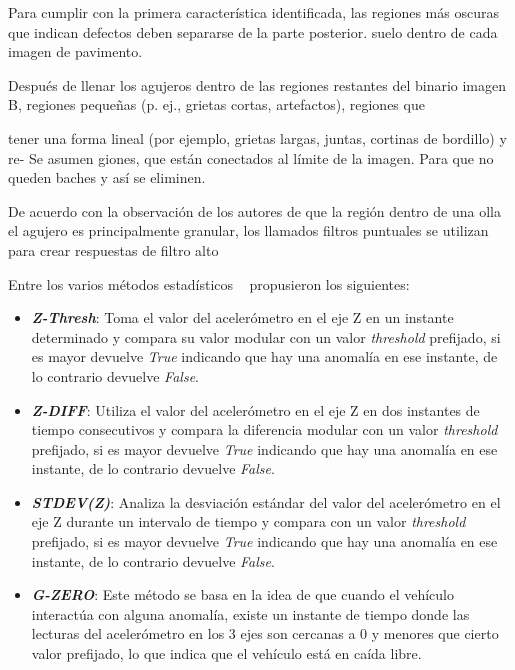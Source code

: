 Para cumplir con la primera característica identificada, las regiones más oscuras que indican defectos deben separarse de la parte posterior.
suelo dentro de cada imagen de pavimento.

Después de llenar los agujeros dentro de las regiones restantes del binario
imagen B, regiones pequeñas (p. ej., grietas cortas, artefactos), regiones que

tener una forma lineal (por ejemplo, grietas largas, juntas, cortinas de bordillo) y re-
Se asumen giones, que están conectados al límite de la imagen.
Para que no queden baches y así se eliminen.


De acuerdo con la observación de los autores de que la región dentro de una olla
el agujero es principalmente granular, los llamados filtros puntuales se utilizan para crear
respuestas de filtro alto


Entre los varios métodos estadísticos ~\parencite{mednis2011real} propusieron los siguientes:\\

\begin{itemize}
	\item  \emph{\textbf {Z-Thresh}}: Toma el valor del acelerómetro en el eje Z en un instante determinado y compara su valor modular con 
	un valor \emph{threshold} prefijado, si es mayor devuelve \emph{True} indicando que hay una anomalía en ese instante, de lo contrario
	devuelve \emph{False}.\\
	\item \emph{\textbf {Z-DIFF}}: Utiliza el valor del acelerómetro en el eje Z en dos instantes de tiempo consecutivos y compara la
		diferencia modular con un valor \emph{threshold} prefijado, si es mayor devuelve \emph{True} indicando que hay una anomalía en ese
		instante, de lo contrario devuelve \emph{False}.\\
	\item \emph{\textbf {STDEV(Z)}}: Analiza la desviación estándar del valor del acelerómetro en el eje Z durante un intervalo de
		tiempo y compara con un valor \emph{threshold} prefijado, si es mayor devuelve \emph{True} indicando que hay una anomalía en ese
		instante, de lo contrario devuelve \emph{False}.\\ 
	\item \emph{\textbf {G-ZERO}}: Este método se basa en la idea de que cuando el vehículo interactúa con alguna anomalía, existe un
		instante de tiempo donde las lecturas del acelerómetro en los 3 ejes son cercanas a 0 y menores que cierto valor prefijado, lo que
		indica que el vehículo está en caída libre.\\
\end{itemize}

